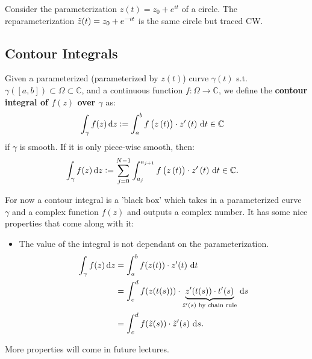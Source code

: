 \begin{example}[CW circle]
Consider the parameterization $z(t) = z_0+e^{it}$ of a circle. The reparameterization $\Tilde{z}(t) = z_0+e^{-it}$ is the same circle but traced CW.
\end{example}

\subsection{Contour Integrals}
\begin{definition}
Given a parameterized (parameterized by $z(t)$) curve $\gamma(t)$ s.t. $\gamma([a,b]) \subset \Omega \subset \mathbb{C}$, and a continuous function $f:\Omega \rightarrow \mathbb{C}$, we define the \textbf{contour integral of $f(z)$ over $\gamma$} as:
\begin{align*}
    \int_{\gamma} f(z)  \dif z & \vcentcolon= \int_a^bf \br{z\br{t}} \cdot z'\br{t} \,  \dif t \in \mathbb{C}
\end{align*}
if $\gamma$ is smooth. If it is only piece-wise smooth, then:
\begin{align*}
    \int_{\gamma} f(z)  \dif z & \vcentcolon= \sum_{j=0}^{N-1} \int_{a_j}^{a_{j+1}}f\br{z\br{t}} \cdot z'\br{t} \,  \dif t \in \mathbb{C}.
\end{align*}

\end{definition}


For now a contour integral is a 'black box' which takes in a parameterized curve $\gamma$ and a complex function $f(z)$ and outputs a complex number. It has some nice properties that come along with it:

\begin{itemize}
    \item The value of the integral is not dependant on the parameterization.
    \begin{align*}
        \int_{\gamma} f(z)  \dif z &= \int_a^bf(z(t)) \cdot z'(t) \,  \dif t\\
        &= \int_c^d f(z(t(s))) \cdot \underbrace{z'(t(s)) \cdot t'(s)}_{\Tilde{z}'(s) \text{ by chain rule}} \,  \dif s\\
        &= \int_c^df(\Tilde{z}(s)) \cdot \Tilde{z}'(s) \,  \dif s.
    \end{align*}
\end{itemize}

More properties will come in future lectures.

